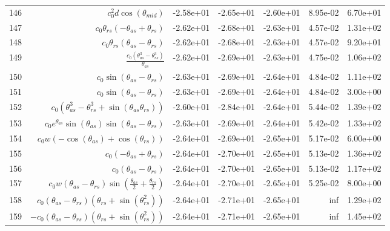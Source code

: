 \begin{tabularx}{\textwidth}{lRRRRRl}
146  &  $ c_{0}^{2} d \cos{\left(\theta_{mid} \right)} $  &  -2.58e+01  &  -2.65e+01  &  -2.60e+01  &  8.95e-02  &  6.70e+01  \\ 
147  &  $ c_{0} \theta_{rs} \left(- \theta_{as} + \theta_{rs}\right) $  &  -2.62e+01  &  -2.68e+01  &  -2.63e+01  &  4.57e-02  &  1.31e+02  \\ 
148  &  $ c_{0} \theta_{rs} \left(\theta_{as} - \theta_{rs}\right) $  &  -2.62e+01  &  -2.68e+01  &  -2.63e+01  &  4.57e-02  &  9.20e+01  \\ 
149  &  $ \displaystyle\frac{c_{0} \left(\theta_{as}^{3} - \theta_{rs}^{3}\right)}{\theta_{as}} $  &  -2.62e+01  &  -2.69e+01  &  -2.63e+01  &  4.75e-02  &  1.06e+02  \\ 
150  &  $ c_{0} \sin{\left(\theta_{as} - \theta_{rs} \right)} $  &  -2.63e+01  &  -2.69e+01  &  -2.64e+01  &  4.84e-02  &  1.11e+02  \\ 
151  &  $ c_{0} \sin{\left(\theta_{as} - \theta_{rs} \right)} $  &  -2.63e+01  &  -2.69e+01  &  -2.64e+01  &  4.84e-02  &  3.00e+00  \\ 
152  &  $ c_{0} \left(\theta_{as}^{3} - \theta_{rs}^{3} + \sin{\left(\theta_{as} \theta_{rs} \right)}\right) $  &  -2.60e+01  &  -2.84e+01  &  -2.64e+01  &  5.44e-02  &  1.39e+02  \\ 
153  &  $ c_{0} e^{\theta_{as}} \sin{\left(\theta_{as} \right)} \sin{\left(\theta_{as} - \theta_{rs} \right)} $  &  -2.63e+01  &  -2.69e+01  &  -2.64e+01  &  5.42e-02  &  1.33e+02  \\ 
154  &  $ c_{0} w \left(- \cos{\left(\theta_{as} \right)} + \cos{\left(\theta_{rs} \right)}\right) $  &  -2.64e+01  &  -2.69e+01  &  -2.65e+01  &  5.17e-02  &  6.00e+00  \\ 
155  &  $ c_{0} \left(- \theta_{as} + \theta_{rs}\right) $  &  -2.64e+01  &  -2.70e+01  &  -2.65e+01  &  5.13e-02  &  1.36e+02  \\ 
156  &  $ c_{0} \left(\theta_{as} - \theta_{rs}\right) $  &  -2.64e+01  &  -2.70e+01  &  -2.65e+01  &  5.13e-02  &  1.17e+02  \\ 
157  &  $ c_{0} w \left(\theta_{as} - \theta_{rs}\right) \sin{\left(\displaystyle\frac{\theta_{as}}{2} + \displaystyle\frac{\theta_{rs}}{2} \right)} $  &  -2.64e+01  &  -2.70e+01  &  -2.65e+01  &  5.25e-02  &  8.00e+00  \\ 
158  &  $ c_{0} \left(\theta_{as} - \theta_{rs}\right) \left(\theta_{rs} + \sin{\left(\theta_{rs}^{2} \right)}\right) $  &  -2.64e+01  &  -2.71e+01  &  -2.65e+01  &  inf  &  1.29e+02  \\ 
159  &  $ - c_{0} \left(\theta_{as} - \theta_{rs}\right) \left(\theta_{rs} + \sin{\left(\theta_{rs}^{2} \right)}\right) $  &  -2.64e+01  &  -2.71e+01  &  -2.65e+01  &  inf  &  1.45e+02  \\ 

\end{tabularx}
